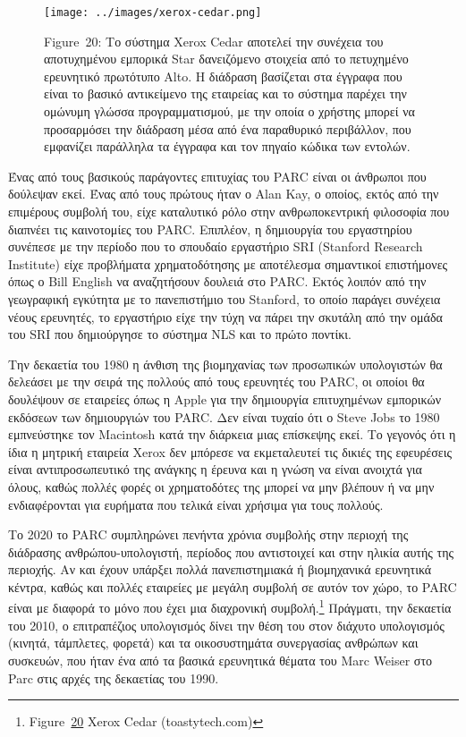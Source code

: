 \documentclass[
]{article}
\begin{document}
\leavevmode{}%
\begin{figure}
\hypertarget{fig:xerox-cedar}{%
\centering
\texttt{[image: ../images/xerox-cedar.png]}
\caption{Figure~20: Το σύστημα Xerox Cedar αποτελεί την συνέχεια του
αποτυχημένου εμπορικά Star δανειζόμενο στοιχεία από το πετυχημένο
ερευνητικό πρωτότυπο Alto. Η διάδραση βασίζεται στα έγγραφα που είναι το
βασικό αντικείμενο της εταιρείας και το σύστημα παρέχει την ομώνυμη
γλώσσα προγραμματισμού, με την οποία ο χρήστης μπορεί να προσαρμόσει την
διάδραση μέσα από ένα παραθυρικό περιβάλλον, που εμφανίζει παράλληλα τα
έγγραφα και τον πηγαίο κώδικα των εντολών.}\label{fig:xerox-cedar}
}
\end{figure}

Ένας από τους βασικούς παράγοντες επιτυχίας του PARC είναι οι άνθρωποι
που δούλεψαν εκεί. Ένας από τους πρώτους ήταν ο Alan Kay, ο οποίος,
εκτός από την επιμέρους συμβολή του, είχε καταλυτικό ρόλο στην
ανθρωποκεντρική φιλοσοφία που διαπνέει τις καινοτομίες του PARC.
Επιπλέον, η δημιουργία του εργαστηρίου συνέπεσε με την περίοδο που το
σπουδαίο εργαστήριο SRI (Stanford Research Institute) είχε προβλήματα
χρηματοδότησης με αποτέλεσμα σημαντικοί επιστήμονες όπως ο Bill English
να αναζητήσουν δουλειά στο PARC. Εκτός λοιπόν από την γεωγραφική
εγκύτητα με το πανεπιστήμιο του Stanford, το οποίο παράγει συνέχεια
νέους ερευνητές, το εργαστήριο είχε την τύχη να πάρει την σκυτάλη από
την ομάδα του SRI που δημιούργησε το σύστημα NLS και το πρώτο ποντίκι.

Την δεκαετία του 1980 η άνθιση της βιομηχανίας των προσωπικών
υπολογιστών θα δελεάσει με την σειρά της πολλούς από τους ερευνητές του
PARC, οι οποίοι θα δουλέψουν σε εταιρείες όπως η Apple για την
δημιουργία επιτυχημένων εμπορικών εκδόσεων των δημιουργιών του PARC. Δεν
είναι τυχαίο ότι ο Steve Jobs το 1980 εμπνεύστηκε τον Macintosh κατά την
διάρκεια μιας επίσκεψης εκεί. Το γεγονός ότι η ίδια η μητρική εταιρεία
Xerox δεν μπόρεσε να εκμεταλευτεί τις δικιές της εφευρέσεις είναι
αντιπροσωπευτικό της ανάγκης η έρευνα και η γνώση να είναι ανοιχτά για
όλους, καθώς πολλές φορές οι χρηματοδότες της μπορεί να μην βλέπουν ή να
μην ενδιαφέρονται για ευρήματα που τελικά είναι χρήσιμα για τους
πολλούς.

Το 2020 το PARC συμπληρώνει πενήντα χρόνια συμβολής στην περιοχή της
διάδρασης ανθρώπου-υπολογιστή, περίοδος που αντιστοιχεί και στην ηλικία
αυτής της περιοχής. Αν και έχουν υπάρξει πολλά πανεπιστημιακά ή
βιομηχανικά ερευνητικά κέντρα, καθώς και πολλές εταιρείες με μεγάλη
συμβολή σε αυτόν τον χώρο, το PARC είναι με διαφορά το μόνο που έχει μια
διαχρονική συμβολή.\footnote{Figure~\protect\hyperlink{fig:xerox-cedar}{20}
  Xerox Cedar (toastytech.com)} Πράγματι, την δεκαετία του 2010, ο
επιτραπέζιος υπολογισμός δίνει την θέση του στον διάχυτο υπολογισμός
(κινητά, τάμπλετες, φορετά) και τα οικοσυστημάτα συνεργασίας ανθρώπων
και συσκευών, που ήταν ένα από τα βασικά ερευνητικά θέματα του Marc
Weiser στο Parc στις αρχές της δεκαετίας του 1990.
\end{document}
